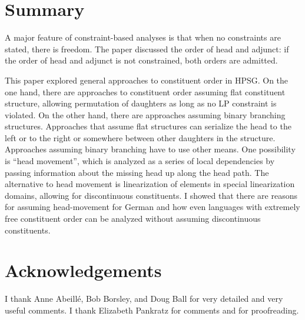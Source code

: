 \documentclass[output=paper]{langsci/langscibook}
\begin{document}
\section{Summary}

A major feature of constraint-based analyses is that when no constraints are stated, there is
freedom. The paper discussed the order of head and adjunct: if the order of head and adjunct is not
constrained, both orders are admitted. 

This paper explored general approaches to constituent order in HPSG. On the one hand, there are
approaches to constituent order assuming flat constituent structure, allowing permutation of daughters as long as no LP
constraint is violated. On the other hand, there are approaches assuming binary branching
structures. Approaches that assume flat structures can serialize the head to the left or to the
right or somewhere between other daughters in the structure. Approaches assuming binary branching
have to use other means. One possibility is ``head movement'', which is analyzed as a series of
local dependencies by passing information about the missing head up along the head path. The
alternative to head movement is linearization of elements in special linearization domains, allowing
for discontinuous constituents. I showed that there are reasons for assuming head-movement for
German and how even languages with extremely free constituent order can be analyzed without assuming
discontinuous constituents.



\section*{Acknowledgements}

I thank Anne Abeillé, Bob Borsley, and Doug Ball for very detailed and very useful comments. I thank
Elizabeth Pankratz for comments and for proofreading.

{\sloppy
\printbibliography[heading=subbibliography,notkeyword=this] 
}
\end{document}
